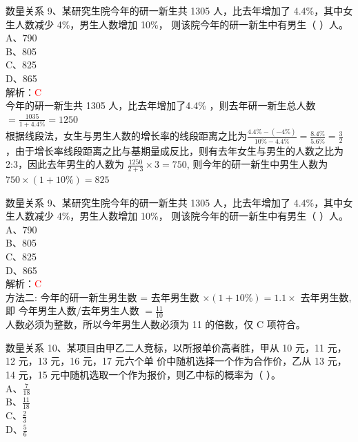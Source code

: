 \documentclass[aspectratio=169]{beamer}
\begin{document}
\begin{frame}[t]{数量关系}
    9、某研究生院今年的研一新生共 1305 人，比去年增加了 4.4\%，其中女生人数减少 4\%，男生人数增加 10\%，
    则该院今年的研一新生中有男生（ ）人。\\
    A、790\\
    B、805\\
    C、825\\
    D、865\\
    解析：\textcolor{red}{C}\\
    今年的研一新生共 1305 人，比去年增加了4.4\% ，则去年研一新生总人数$=\frac{1035}{1+4.4\%}= 1250$ \\
    根据线段法，女生与男生人数的增长率的线段距离之比为$\frac{4.4\%-(-4\%)}{10\% - 4.4\%} = \frac{8.4\%}{5.6\%} = \frac{3}{2}$\\
    ，由于增长率线段距离之比与基期量成反比，则有去年女生与男生的人数之比为 2:3，因此去年男生的人数为 $\frac{1250}{2+3} \times 3 = 750$,
    则今年的研一新生中男生人数为 $750 \times (1+10\%) = 825$ \\
\end{frame}

\begin{frame}[t]{数量关系}
    9、某研究生院今年的研一新生共 1305 人，比去年增加了 4.4\%，其中女生人数减少 4\%，男生人数增加 10\%，
    则该院今年的研一新生中有男生（ ）人。\\
    A、790\\
    B、805\\
    C、825\\
    D、865\\
    解析：\textcolor{red}{C}\\
    方法二: 今年的研一新生男生数 = 去年男生数 $\times (1+10\%)  = 1.1 \times $ 去年男生数,即 
    今年男生人数/去年男生人数 $= \frac{11}{10}$ \\
    人数必须为整数，所以今年男生人数必须为 11 的倍数，仅 C 项符合。\\
\end{frame}




\begin{frame}[t]{数量关系}
    10、某项目由甲乙二人竞标，以所报单价高者胜，甲从 10 元，11 元，12 元，13 元，16 元，17 元六个单
    价中随机选择一个作为合作价，乙从 13 元，14 元，15 元中随机选取一个作为报价，则乙中标的概率为（ ）。\\
    A、$\frac{7}{18}$  \\
    B、$\frac{11}{18}$ \\
    C、$\frac{2}{3} $  \\
    D、$\frac{5}{6} $  \\
\end{frame}
\end{document}
